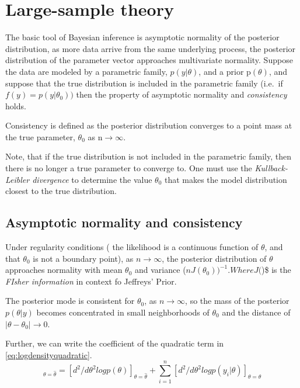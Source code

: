 \documentclass[
]{book}
\theoremstyle{definition}
\theoremstyle{definition}
\theoremstyle{definition}
\theoremstyle{definition}
\theoremstyle{remark}
\begin{document}
\hypertarget{large-sample-theory}{%
\section{Large-sample theory}\label{large-sample-theory}}

The basic tool of Bayesian inference is asymptotic normality of the posterior distribution, as more data arrive from the same underlying process, the posterior distribution of the parameter vector approaches multivariate normality. Suppose the data are modeled by a parametric family, \(p(y|\theta)\), and a prior p\((\theta)\), and suppose that the true distribution is included in the parametric family (i.e.~if \(f(y) = p(y|\theta_0))\) then the property of asymptotic normality and \emph{consistency} holds.

Consistency is defined as the posterior distribution converges to a point mass at the true parameter, \(\theta_0\) as n\(\to \infty\).

Note, that if the true distribution is not included in the parametric family, then there is no longer a true parameter to converge to. One must use the \emph{Kullback-Leibler divergence} to determine the value \(\theta_0\) that makes the model distribution closest to the true distribution.

\hypertarget{asymptotic-normality-and-consistency}{%
\subsection*{Asymptotic normality and consistency}\label{asymptotic-normality-and-consistency}}

Under regularity conditions ( the likelihood is a continuous function of \(\theta\), and that \(\theta_0\) is not a boundary point), as \(n\to \infty\), the posterior distribution of \(\theta\) approaches normality with mean \(\theta_0\) and variance (\(nJ(\theta_0))^{-1}. Where J(\)\theta)\$ is the \emph{FIsher information} in context fo Jeffreys' Prior.

The posterior mode is consistent for \(\theta_0\), as \(n\to \infty\), so the mass of the posterior \(p(\theta|y)\) becomes concentrated in small neighborhoods of \(\theta_0\) and the distance of \(|\theta-\theta_0|\to 0\).

Further, we can write the coefficient of the quadratic term in \eqref{eq:logdensityquadratic}.
\begin{equation}
[d^2/d\theta^2 log p(\theta|y)]_{\theta=\hat{\theta}} =[d^2/d\theta^2log p(\theta)]_{\theta=\hat{\theta}}+\sum_{i=1}^n[d^2/d\theta^2log p(y_i|\theta)]_{\theta=\hat{\theta}}
\end{equation}
\end{document}
